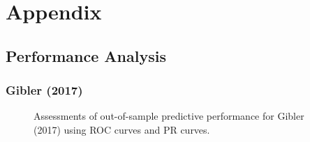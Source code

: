 \clearpage

\renewcommand{\thefigure}{A\arabic{figure}}
\setcounter{figure}{0}
\renewcommand{\thetable}{A.\arabic{table}}
\setcounter{table}{0}
\renewcommand{\thesection}{A.\arabic{section}}
\setcounter{section}{0}

\section*{\textbf{Appendix}}

\subsection*{Performance Analysis}

\subsubsection*{Gibler (2017)}

\begin{figure}
	\centering   
	\caption{Assessments of out-of-sample predictive performance for Gibler (2017) using ROC curves and PR curves.}
\end{figure}
\FloatBarrier

